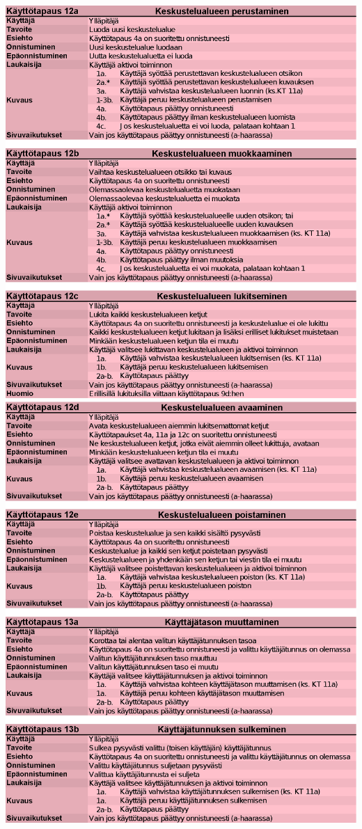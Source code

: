 \documentclass[11pt]{article}
\begin{document}
		\includegraphics[trim = 21mm 0mm 0mm 25mm]{kayttotapausmalli-sivu-7.eps}\\
		\includegraphics[trim = 21mm 0mm 0mm 25mm]{kayttotapausmalli-sivu-8.eps}\\
\end{document}

